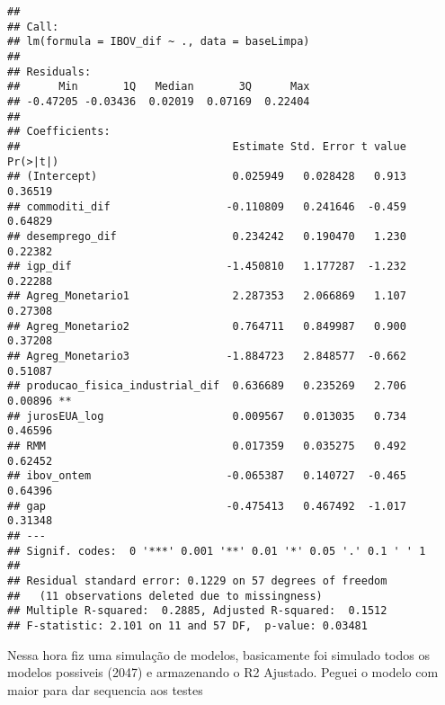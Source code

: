 \documentclass[
]{article}
\begin{document}
\begin{verbatim}
## 
## Call:
## lm(formula = IBOV_dif ~ ., data = baseLimpa)
## 
## Residuals:
##      Min       1Q   Median       3Q      Max 
## -0.47205 -0.03436  0.02019  0.07169  0.22404 
## 
## Coefficients:
##                                 Estimate Std. Error t value Pr(>|t|)   
## (Intercept)                     0.025949   0.028428   0.913  0.36519   
## commoditi_dif                  -0.110809   0.241646  -0.459  0.64829   
## desemprego_dif                  0.234242   0.190470   1.230  0.22382   
## igp_dif                        -1.450810   1.177287  -1.232  0.22288   
## Agreg_Monetario1                2.287353   2.066869   1.107  0.27308   
## Agreg_Monetario2                0.764711   0.849987   0.900  0.37208   
## Agreg_Monetario3               -1.884723   2.848577  -0.662  0.51087   
## producao_fisica_industrial_dif  0.636689   0.235269   2.706  0.00896 **
## jurosEUA_log                    0.009567   0.013035   0.734  0.46596   
## RMM                             0.017359   0.035275   0.492  0.62452   
## ibov_ontem                     -0.065387   0.140727  -0.465  0.64396   
## gap                            -0.475413   0.467492  -1.017  0.31348   
## ---
## Signif. codes:  0 '***' 0.001 '**' 0.01 '*' 0.05 '.' 0.1 ' ' 1
## 
## Residual standard error: 0.1229 on 57 degrees of freedom
##   (11 observations deleted due to missingness)
## Multiple R-squared:  0.2885, Adjusted R-squared:  0.1512 
## F-statistic: 2.101 on 11 and 57 DF,  p-value: 0.03481
\end{verbatim}

Nessa hora fiz uma simulação de modelos, basicamente foi simulado todos
os modelos possiveis (2047) e armazenando o R2 Ajustado. Peguei o modelo
com maior para dar sequencia aos testes
\end{document}
